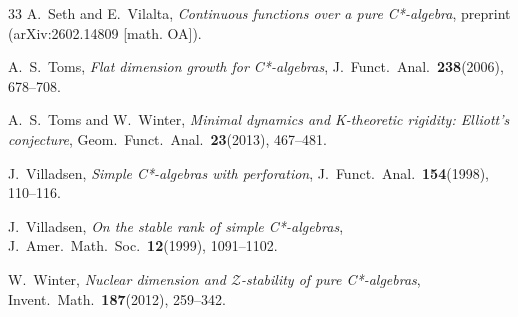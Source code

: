 \documentclass[10pt]{amsart}
\numberwithin{equation}{section}
\theoremstyle{definition}
\begin{document}
\begin{thebibliography}{33}
A.~Seth and E.~Vilalta,
{\emph{Continuous functions over a pure C*-algebra}},
preprint (arXiv:2602.14809 [math. OA]).

A.~S.\  Toms,
{\emph{Flat dimension growth for C*-algebras}},
J.~Funct.\  Anal.\  {\textbf{238}}(2006), 678--708.

 A.~S.\  Toms and W.~Winter,
{\emph{Minimal dynamics and K-theoretic rigidity:
   Elliott's conjecture}},
Geom.\  Funct.\  Anal.\  {\textbf{23}}(2013), 467--481.

J.~Villadsen,
{\emph{Simple C*-algebras with perforation}},
J.~Funct.\  Anal.\  {\textbf{154}}(1998), 110--116.

J.~Villadsen,
{\emph{On the stable rank of simple C*-algebras}},
J.~Amer.\  Math.\  Soc.\  {\textbf{12}}(1999),  1091--1102.

W.~Winter,
{\emph{Nuclear dimension and $\mathcal{Z}$-stability
 of pure C*-algebras}},
Invent.\  Math.\  {\textbf{187}}(2012), 259--342.

\end{thebibliography}
\end{document}
